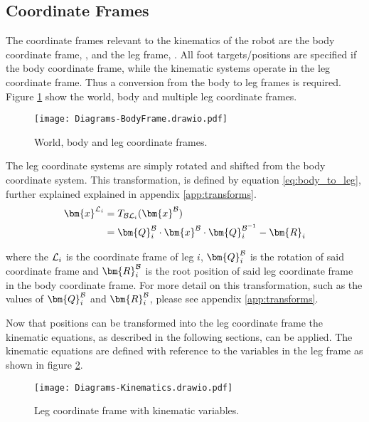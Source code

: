         \subsection{Coordinate Frames}
            The coordinate frames relevant to the kinematics of the robot are the body coordinate frame, \fbody, and the leg frame, \fleg. All foot targets/positions are specified
            if the body coordinate frame, while the kinematic systems operate in the leg coordinate frame. Thus a conversion from the body to leg frames is required. 
            Figure \ref{fig:coords_top} show the world, body and multiple leg coordinate frames.
            \begin{figure}[h]
                \centering
                \texttt{[image: Diagrams-BodyFrame.drawio.pdf]}
                \caption{World, body and leg coordinate frames.}
                \label{fig:coords_top}
            \end{figure}

            \noindent
            The leg coordinate systems are simply rotated and shifted from the body coordinate system. This transformation, is defined by equation \ref{eq:body_to_leg},
            further explained explained in appendix \ref{app:transforms}.
            \begin{equation}\label{eq:body_to_leg}
            \begin{split}
                \bm{x}^\fleg &= \transframe{\bm{x}^\fbody}{\fbody}{\fleg} \\
                & = \bm{Q}_i^\fbody\cdot\bm{x}^\fbody\cdot\bm{Q}^{\fbody^{-1}}_{i} - \bm{R}_i
            \end{split}
            \end{equation}

            \noindent
            where the \(\fleg\) is the coordinate frame of leg \(i\), \(\bm{Q}_i^\fbody\) is the rotation of said coordinate frame and \(\bm{R}^\fbody_i\) is the root position of
            said leg coordinate frame in the body coordinate frame. For more detail on this transformation, such as the values of \(\bm{Q}_i^\fbody\) and \(\bm{R}^\fbody_i\), please see
            appendix \ref{app:transforms}.

            Now that positions can be transformed into the leg coordinate frame the kinematic equations, as described in the following sections, can be applied. The kinematic equations are defined
            with reference to the variables in the leg frame as shown in figure \ref{fig:kinematics}.
            \begin{figure}[h]
                \centering
                \texttt{[image: Diagrams-Kinematics.drawio.pdf]}
                \caption{Leg coordinate frame with kinematic variables.}
                \label{fig:kinematics}
            \end{figure}

